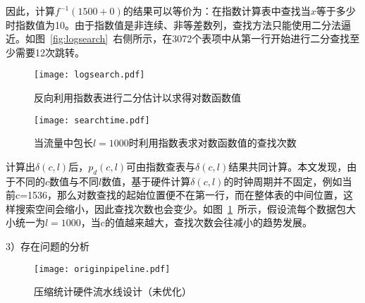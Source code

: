因此，计算$ f^{-1}(1500+0) $的结果可以等价为：在指数计算表中查找当$ x $等于多少时指数值为10。由于指数值是非连续、非等差数列，查找方法只能使用二分法逼近。如图~\ref{fig:logsearch}~右侧所示，在3072个表项中从第一行开始进行二分查找至少需要12次跳转。


\begin{figure}[htbp]
	\centering 
	\vspace{-1.5mm}
	\begin{minipage}[t]{0.52\textwidth}
		\centering
		\texttt{[image: logsearch.pdf]}
		\caption{反向利用指数表进行二分估计以求得对数函数值} \label{fig:logsearch}
	\end{minipage}
	\begin{minipage}[t]{0.44\textwidth}
		\centering
		\texttt{[image: searchtime.pdf]}
		\caption{当流量中包长$l=1000$时利用指数表求对数函数值的查找次数} \label{fig:searchtime}
	\end{minipage}
\end{figure}


计算出$ \delta(c,l)$后，$p_d(c,l) $可由指数查表与$ \delta(c,l)$结果共同计算。本文发现，由于不同的$ c $数值与不同$ l $数值，基于硬件计算$ \delta(c,l)$的时钟周期并不固定，例如当前c=1536，那么对数查找的起始位置便不在第一行，而在整体表的中间位置，这样搜索空间会缩小，因此查找次数也会变少。如图~\ref{fig:searchtime}~所示，假设流每个数据包大小统一为$ l=1000 $，当c的值越来越大，查找次数会往减小的趋势发展。




3）存在问题的分析

\begin{figure}[!ht]
	\centering 
	\vspace{-1.5mm}
	\texttt{[image: originpipeline.pdf]}
	\caption{压缩统计硬件流水线设计（未优化）} \label{fig:originpipeline}
\end{figure}

